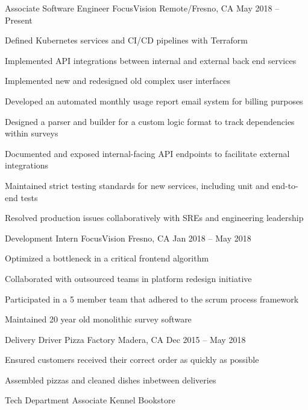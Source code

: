 \documentclass[]{awesome-cv}
\begin{document}
\vspace{-2mm}
\begin{cventries}
	\cventry
	{Associate Software Engineer}
	{FocusVision}
	{Remote/Fresno, CA}
	{May 2018 – Present}
	{\begin{cvitems}
		\item {Defined Kubernetes services and CI/CD pipelines with Terraform}
		\item {Implemented API integrations between internal and external back end services}
		\item {Implemented new and redesigned old complex user interfaces}
		\item {Developed an automated monthly usage report email system for billing purposes}
		\item {Designed a parser and builder for a custom logic format to track dependencies within surveys}
		\item {Documented and exposed internal-facing API endpoints to facilitate external integrations}
		\item {Maintained strict testing standards for new services, including unit and end-to-end tests}
		\item {Resolved production issues collaboratively with SREs and engineering leadership}
		\end{cvitems}}
	\cventry
	{Development Intern}
	{FocusVision}
	{Fresno, CA}
	{Jan 2018 – May 2018}
	{\begin{cvitems}
		\item {Optimized a bottleneck in a critical frontend algorithm}
		\item {Collaborated with outsourced teams in platform redesign initiative}
		\item {Participated in a 5 member team that adhered to the scrum process framework}
		\item {Maintained 20 year old monolithic survey software}
		\end{cvitems}}
	\cventry
	{Delivery Driver}
	{Pizza Factory}
	{Madera, CA}
	{Dec 2015 – May 2018}
	{\begin{cvitems}
		\item {Ensured customers received their correct order as quickly as possible}
		\item {Assembled pizzas and cleaned dishes inbetween deliveries}
		\end{cvitems}}
	\cventry
	{Tech Department Associate}
	{Kennel Bookstore}

\end{cventries}
\end{document}
